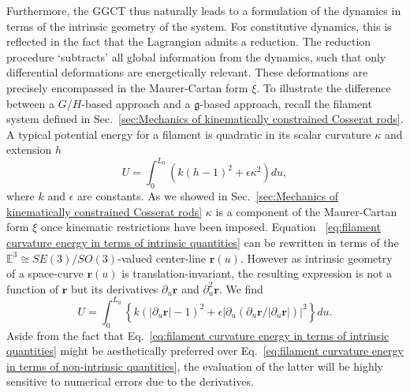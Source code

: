 Furthermore, the GGCT thus naturally leads to a formulation of the dynamics in terms of the intrinsic geometry of the system. For constitutive dynamics, this is reflected in the fact that the Lagrangian admits a reduction. The reduction procedure `subtracts' all global information from the dynamics, such that only differential deformations are energetically relevant. These deformations are precisely encompassed in the Maurer-Cartan form $\xi$. To illustrate the difference between a $G/H$-based approach and a $\mathfrak{g}$-based approach, recall the filament system defined in Sec.~\ref{sec:Mechanics of kinematically constrained Cosserat rods}. A typical potential energy for a filament is quadratic in its scalar curvature $\kappa$ and extension $h$ \citep{sodaDynamicsStiffChains1973, goldsteinNonlinearDynamicsStiff1995}
\begin{equation} \label{eq:filament curvature energy in terms of intrinsic quantities}
U = \int_0^{L_0} (k (h-1)^2 +  \epsilon \kappa^2) du,
\end{equation}
where $k$ and $\epsilon$ are constants. As we showed in Sec.~\ref{sec:Mechanics of kinematically constrained Cosserat rods} $\kappa$ is a component of the Maurer-Cartan form $\xi$ once kinematic restrictions have been imposed. Equation ~\ref{eq:filament curvature energy in terms of intrinsic quantities} can be rewritten in terms of the $\mathbb{E}^3 \cong SE(3)/SO(3)$-valued center-line $\mathbf{r}(u)$. However as intrinsic geometry of a space-curve $\mathbf{r}(u)$ is translation-invariant, the resulting expression is not a function of $\mathbf{r}$ but its derivatives $\partial_u \mathbf{r}$ and $\partial_u^2 \mathbf{r}$. We find
\begin{equation} \label{eq:filament curvature energy in terms of non-intrinsic quantities}
U = \int_0^{L_0} \left\{ k \left( |\partial_u \mathbf{r}| - 1 \right)^2 + \epsilon \left| \partial_u \left( \partial_u \mathbf{r} / |\partial_u \mathbf{r} | \right) \right|^2  \right\} du.
\end{equation}
Aside from the fact that Eq.~\ref{eq:filament curvature energy in terms of intrinsic quantities} might be aesthetically preferred over Eq.~\ref{eq:filament curvature energy in terms of non-intrinsic quantities}, the evaluation of the latter will be highly sensitive to numerical errors due to the derivatives.

